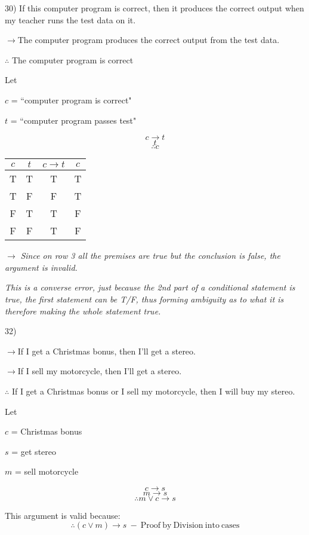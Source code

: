\documentclass[11pt]{article}
\begin{document}
\begin{flushleft}
	\hrulefill
	
	30) If this computer program is correct, then it produces the correct output when my teacher runs the test data on it.
	
	$\to$The computer program produces the correct output from the test data.
	
	$\therefore$ The computer program is correct
	
	Let 
	
	$c$ = ``computer program is correct"
	
	$t$	= ``computer program passes test"
	
	$$c \to t$$
	$$t$$
	$$\therefore c$$
		
	\begin{center}
	\begin{tabular}{|c|c|c|c|}\hline
	$c$&$t$&$c \to t$&$c$ \\ \hline
	
	T&T&T&T \\ \hline
	T&F&F&T \\ \hline
	F&T&T&F \\ \hline
	F&F&T&F \\ \hline	
	
	\end{tabular}
	\end{center}
	
	$\to$ \textit{Since on row 3 all the premises are true but the conclusion is false, the argument is invalid.}
	
	\textit{This is a converse error, just because the 2nd part of a conditional statement is true, the first statement can be T/F, thus forming ambiguity as to what it is therefore making the whole statement true.}
	
	\hrulefill
	
	32) 
	
	$\to$If I get a Christmas bonus, then I'll get a stereo.
		
	$\to$If I sell my motorcycle, then I'll get a stereo.
			
	$\therefore$ If I get a Christmas bonus or I sell my motorcycle, then I will buy my stereo.
				
	Let
	
	$c$ = Christmas bonus
	
	$s$ = get stereo
	
	$m$ = sell motorcycle
	
	$$c \to s$$
	$$m \to s$$
	$$\therefore m \lor c \to s$$
	
	This argument is valid because: 
	$$\therefore (c \lor m) \to s \ -\ \mathrm{Proof \ by \ Division \ into \ cases}$$


\end{flushleft}
\end{document}
